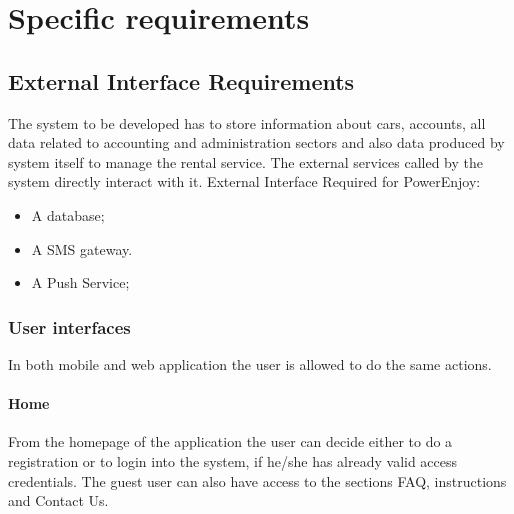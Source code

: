 \chapter{Specific requirements}

\section{External Interface Requirements }
The system to be developed has to store information about cars, accounts, all data related to accounting and administration sectors and also data produced by system itself to manage the rental service. The external services called by the system directly interact with it.
External Interface Required for PowerEnjoy:
\begin{itemize}
\item A database;
\item A SMS gateway.
\item A Push Service;
\end{itemize}

\subsection{User interfaces}
In both mobile and web application the user is allowed to do the same actions.
\subsubsection{Home}
From the homepage of the application the user can decide either to do a registration or to login into the system, if he/she has already valid access credentials.
The guest user can also have access to the sections FAQ, instructions and Contact Us.

